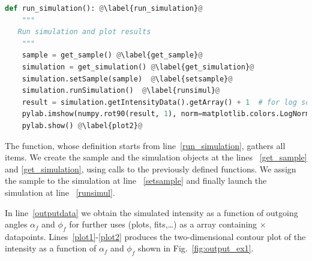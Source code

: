 \begin{lstlisting}[language=python, style=eclipseboxed,name=ex1,nolol]
def run_simulation(): @\label{run_simulation}@
    """
   Run simulation and plot results
    """
    sample = get_sample() @\label{get_sample}@
    simulation = get_simulation() @\label{get_simulation}@
    simulation.setSample(sample)  @\label{setsample}@
    simulation.runSimulation()  @\label{runsimul}@
    result = simulation.getIntensityData().getArray() + 1  # for log scale  @\label{outputdata}@
    pylab.imshow(numpy.rot90(result, 1), norm=matplotlib.colors.LogNorm(), extent=[-1.0, 1.0, 0, 2.0]) @\label{plot1}@
    pylab.show() @\label{plot2}@
\end{lstlisting}
The function, whose definition starts from line~\ref{run_simulation}, gathers all
items. We create the sample and the simulation objects at the lines
~\ref{get_sample} and \ref{get_simulation}, using calls to the previously defined functions. We assign the sample to the simulation at line ~\ref{setsample} and
finally launch the simulation at line ~\ref{runsimul}.

In line~\ref{outputdata} we obtain the simulated intensity
as a function of outgoing angles $\alpha_f$ and $\phi_f$ for further
uses (plots, fits,\ldots) as a  array containing
$\times$
datapoints. Lines~\ref{plot1}-\ref{plot2} produces the two-dimensional
contour plot of the intensity as a function of $\alpha_f$ and
$\phi_f$ shown in Fig.~\ref{fig:output_ex1}.

